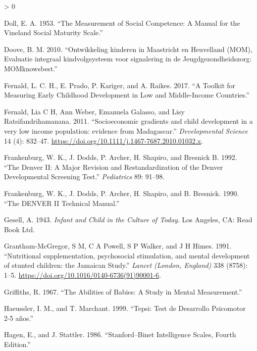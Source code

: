 \documentclass[
]{book}
\newlength{\cslhangindent}
\newenvironment{CSLReferences}[2] %
 {%
  \setlength{\parindent}{0pt}
  \ifodd #1 \everypar{\setlength{\hangindent}{\cslhangindent}}\ignorespaces\fi
  \ifnum #2 > 0
  \setlength{\parskip}{#2\baselineskip}
  \fi
 }%
 {}
\begin{document}
\begin{CSLReferences}{1}{0}
\leavevmode\hypertarget{ref-doll1953}{}%
Doll, E. A. 1953. {``The Measurement of Social Competence: A Manual for the Vineland Social Maturity Scale.''}

\leavevmode\hypertarget{ref-doove2010}{}%
Doove, B. M. 2010. {``{Ontwikkeling kinderen in Maastricht en Heuvelland (MOM), Evaluatie integraal kindvolgsysteem voor signalering in de Jeugdgezondheidszorg: MOMknowsbest.}''}

\leavevmode\hypertarget{ref-fernald2017toolkit}{}%
Fernald, L. C. H., E. Prado, P. Kariger, and A. Raikes. 2017. {``A Toolkit for Measuring Early Childhood Development in Low and Middle-Income Countries.''}

\leavevmode\hypertarget{ref-Fernald2011}{}%
Fernald, Lia C H, Ann Weber, Emanuela Galasso, and Lisy Ratsifandrihamanana. 2011. {``{Socioeconomic gradients and child development in a very low income population: evidence from Madagascar.}''} \emph{Developmental Science} 14 (4): 832--47. \url{https://doi.org/10.1111/j.1467-7687.2010.01032.x}.

\leavevmode\hypertarget{ref-frankenburg1992}{}%
Frankenburg, W. K., J. Dodds, P. Archer, H. Shapiro, and Bresnick B. 1992. {``The Denver II: A Major Revision and Restandardization of the Denver Developmental Screening Test.''} \emph{Pediatrics} 89: 91--98.

\leavevmode\hypertarget{ref-frankenburg1990}{}%
Frankenburg, W. K., J. Dodds, P. Archer, H. Shapiro, and B. Bresnick. 1990. {``The DENVER II Technical Manual.''}

\leavevmode\hypertarget{ref-gesell1943}{}%
Gesell, A. 1943. \emph{Infant and Child in the Culture of Today}. Los Angeles, CA: Read Book Ltd.

\leavevmode\hypertarget{ref-Grantham-McGregor1991}{}%
Grantham-McGregor, S M, C A Powell, S P Walker, and J H Himes. 1991. {``{Nutritional supplementation, psychosocial stimulation, and mental development of stunted children: the Jamaican Study.}''} \emph{Lancet (London, England)} 338 (8758): 1--5. \url{https://doi.org/10.1016/0140-6736(91)90001-6}.

\leavevmode\hypertarget{ref-griffiths1967}{}%
Griffiths, R. 1967. {``The Abilities of Babies: A Study in Mental Measurement.''}

\leavevmode\hypertarget{ref-haeussler1999}{}%
Haeussler, I. M., and T. Marchant. 1999. {``Tepsi: Test de Desarrollo Psicomotor 2-5 años.''}

\leavevmode\hypertarget{ref-hagen1986}{}%
Hagen, E., and J. Stattler. 1986. {``Stanford--Binet Intelligence Scales, Fourth Edition.''}


\end{CSLReferences}
\end{document}
